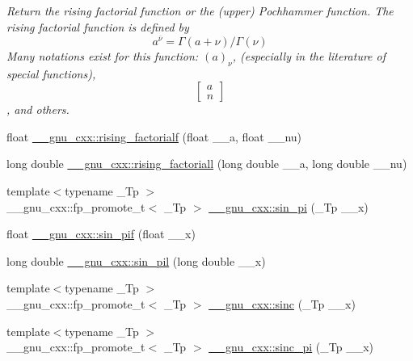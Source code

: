 \begin{DoxyCompactItemize}
\begin{DoxyCompactList}\small\item\em Return the rising factorial function or the (upper) Pochhammer function. The rising factorial function is defined by \[ a^{\overline{\nu}} = \Gamma(a + \nu) / \Gamma(\nu) \] Many notations exist for this function\+: $ (a)_\nu $, (especially in the literature of special functions), \[ \left[ \begin{array}{c} a \\ n \end{array} \right] \], and others. \end{DoxyCompactList}\item 
float \hyperlink{group__gnu__math__spec__func_ga10da05b995a42f0b0625e61186af7449}{\+\_\+\+\_\+gnu\+\_\+cxx\+::rising\+\_\+factorialf} (float \+\_\+\+\_\+a, float \+\_\+\+\_\+nu)
\item 
long double \hyperlink{group__gnu__math__spec__func_gac9a399ae01c315aa78a64b445795d974}{\+\_\+\+\_\+gnu\+\_\+cxx\+::rising\+\_\+factoriall} (long double \+\_\+\+\_\+a, long double \+\_\+\+\_\+nu)
\item 
{\footnotesize template$<$typename \+\_\+\+Tp $>$ }\\\+\_\+\+\_\+gnu\+\_\+cxx\+::fp\+\_\+promote\+\_\+t$<$ \+\_\+\+Tp $>$ \hyperlink{group__gnu__math__spec__func_ga220f8a9a0477697cff96e84dc911d5f0}{\+\_\+\+\_\+gnu\+\_\+cxx\+::sin\+\_\+pi} (\+\_\+\+Tp \+\_\+\+\_\+x)
\item 
float \hyperlink{group__gnu__math__spec__func_ga74fc8e2dd770850e7ea8bf8a28a71777}{\+\_\+\+\_\+gnu\+\_\+cxx\+::sin\+\_\+pif} (float \+\_\+\+\_\+x)
\item 
long double \hyperlink{group__gnu__math__spec__func_ga0bda860961b0a121e266b278f260634b}{\+\_\+\+\_\+gnu\+\_\+cxx\+::sin\+\_\+pil} (long double \+\_\+\+\_\+x)
\item 
{\footnotesize template$<$typename \+\_\+\+Tp $>$ }\\\+\_\+\+\_\+gnu\+\_\+cxx\+::fp\+\_\+promote\+\_\+t$<$ \+\_\+\+Tp $>$ \hyperlink{group__gnu__math__spec__func_ga09976b5d041113979c93613cc3700348}{\+\_\+\+\_\+gnu\+\_\+cxx\+::sinc} (\+\_\+\+Tp \+\_\+\+\_\+x)
\item 
{\footnotesize template$<$typename \+\_\+\+Tp $>$ }\\\+\_\+\+\_\+gnu\+\_\+cxx\+::fp\+\_\+promote\+\_\+t$<$ \+\_\+\+Tp $>$ \hyperlink{group__gnu__math__spec__func_ga5195270024403b985e7d4f2f935f8779}{\+\_\+\+\_\+gnu\+\_\+cxx\+::sinc\+\_\+pi} (\+\_\+\+Tp \+\_\+\+\_\+x)
\item 

\end{DoxyCompactItemize}
